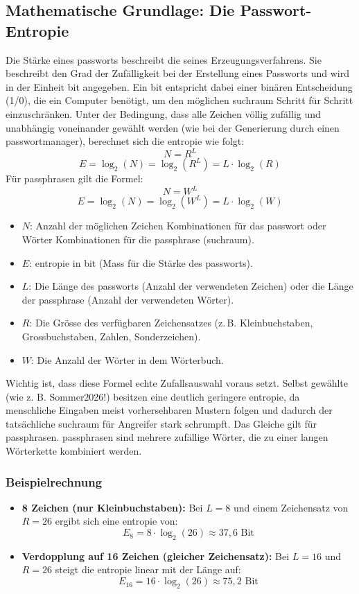 \documentclass[12pt,a4paper]{article}
\begin{document}
\subsection{Mathematische Grundlage: Die Passwort-Entropie}
\label{subsec:entropie}
Die Stärke eines \gls{passwort}s beschreibt die  seines Erzeugungsverfahrens. Sie beschreibt den Grad der Zufälligkeit bei der Erstellung eines Passworts und wird in der Einheit \gls{bit} angegeben. Ein \gls{bit} entspricht dabei einer binären Entscheidung (1/0), die ein Computer benötigt, um den \mbox{möglichen} \gls{suchraum} Schritt für Schritt \\ einzuschränken. Unter der Bedingung, dass alle Zeichen völlig zufällig und unabhängig voneinander gewählt werden (wie bei der Generierung durch einen \gls{passwortmanager}), berechnet sich die \gls{entropie} wie folgt:   
$$N=R^L$$
$$E = \log_2(N) = \log_2(R^L) = L \cdot \log_2(R)$$
Für \gls{passphrase}n gilt die Formel:
$$N = W^L$$
$$E = \log_2(N) = \log_2(W^L) = L \cdot \log_2(W)$$
\begin{itemize}
    \item $N$: Anzahl der möglichen Zeichen Kombinationen für das \gls{passwort} oder Wörter Kombinationen für die \gls{passphrase} (\gls{suchraum}).
    \item $E$: \gls{entropie} in \gls{bit} (Mass für die Stärke des \gls{passwort}s).
    \item $L$: Die Länge des \gls{passwort}s (Anzahl der verwendeten Zeichen) oder die Länge der \gls{passphrase} (Anzahl der verwendeten Wörter).
    \item $R$: Die Grösse des verfügbaren Zeichensatzes (z.\,B. Kleinbuchstaben, \\ Grossbuchstaben, Zahlen, Sonderzeichen).
    \item $W$: Die Anzahl der Wörter in dem Wörterbuch.
\end{itemize}
Wichtig ist, dass diese Formel echte Zufallsauswahl voraus setzt. Selbst gewählte \\  (wie z. B. Sommer2026!) besitzen eine deutlich geringere \gls{entropie}, da \\ menschliche Eingaben meist vorhersehbaren Mustern folgen und dadurch der tatsächliche \gls{suchraum} für Angreifer stark schrumpft. Das Gleiche gilt für \gls{passphrase}n. \gls{passphrase}n sind mehrere zufällige Wörter, die zu einer langen Wörterkette kombiniert werden.
\subsubsection{Beispielrechnung}
\begin{itemize}
    \item \textbf{8 Zeichen (nur Kleinbuchstaben):} Bei $L = 8$ und einem Zeichensatz von $R = 26$ ergibt sich eine \gls{entropie} von:
    \[
    E_8 = 8 \cdot \log_2(26) \approx 37{,}6 \text{ Bit}
    \]
    \item \textbf{Verdopplung auf 16 Zeichen (gleicher Zeichensatz):} Bei $L = 16$ und $R = 26$ steigt die \gls{entropie} linear mit der Länge auf:
    \[
    E_{16} = 16 \cdot \log_2(26) \approx 75{,}2 \text{ Bit}
    \]
\end{itemize}
\end{document}
